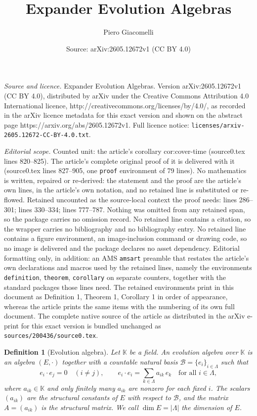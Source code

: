 \documentclass[10pt,a4paper]{amsart}
\title{Expander Evolution Algebras}
\author{Piero Giacomelli}
\date{Source: arXiv:2605.12672v1 (CC BY 4.0)}
\newtheorem{definition}{Definition}
\newcommand{\EA}{E}          %
\newcommand{\K}{\mathbb{K}}
\newcommand{\natbasis}{\mathcal{B}}  %
\newcommand{\strmat}{A}      %
\begin{document}
\maketitle

\noindent\emph{Source and licence.} Expander Evolution Algebras. Version arXiv:2605.12672v1 (CC BY 4.0), distributed by arXiv under the Creative Commons Attribution 4.0 International licence, http://creativecommons.org/licenses/by/4.0/, as recorded in the arXiv licence metadata for this exact version and shown on the abstract page https://arxiv.org/abs/2605.12672v1. Full licence notice: \texttt{licenses/arxiv-2605.12672-CC-BY-4.0.txt}.\par\smallskip

\noindent\textit{Editorial scope.} Counted unit: the article's corollary cor:cover-time (source0.tex lines 820--825). The article's complete original proof of it is delivered with it (source0.tex lines 827--905, one \texttt{proof} environment of 79 lines). No mathematics is written, repaired or re-derived: the statement and the proof are the article's own lines, in the article's own notation, and no retained line is substituted or re-flowed.  Retained uncounted as the source-local context the proof needs: lines 286--301; lines 330--334; lines 777--787.  Nothing was omitted from any retained span, so the package carries no omission record.  No retained line contains a citation, so the wrapper carries no bibliography and no bibliography entry.  No retained line contains a figure environment, an image-inclusion command or drawing code, so no image is delivered and the package declares no asset dependency.  Editorial formatting only, in addition: an AMS \texttt{amsart} preamble that restates the article's own declarations and macros used by the retained lines, namely the environments \texttt{definition}, \texttt{theorem}, \texttt{corollary} on separate counters, together with the standard packages those lines need.  The retained environments print in this document as Definition 1, Theorem 1, Corollary 1 in order of appearance, whereas the article prints the same items with the numbering of its own full document.  The complete native source of the article as distributed in the arXiv e-print for this exact version is bundled unchanged as \texttt{sources/200436/source0.tex}.
\begin{definition}[Evolution algebra]\label{def:ea}
Let $\K$ be a field.  An \emph{evolution algebra} over $\K$ is an
algebra $(\EA,\cdot)$ together with a countable \emph{natural basis}
$\natbasis=\{e_i\}_{i\in\Lambda}$ such that
\[
  e_i \cdot e_j = 0 \quad (i\ne j),
  \qquad
  e_i \cdot e_i = \sum_{k\in\Lambda} a_{ik}\,e_k \quad
  \text{for all }i\in\Lambda,
\]
where $a_{ik}\in\K$ and only finitely many $a_{ik}$ are nonzero for
each fixed $i$.  The scalars $(a_{ik})$ are the
\emph{structural constants} of $\EA$ with respect to $\natbasis$, and
the matrix $\strmat=(a_{ik})$ is the \emph{structural matrix}.  We
call $\dim\EA=|\Lambda|$ the \emph{dimension} of $\EA$.
\end{definition}
\end{document}
